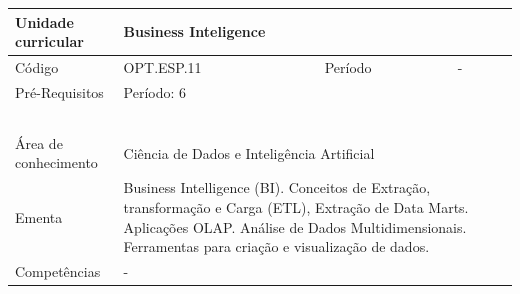 \clearpage
\newpage

\begin{quadro}[ht!]
  \centering\scriptsize
\caption{Unidade Curricular Business Inteligence}

\begin{tabular}{|p{2.5cm}|p{2.5cm}|p{2.5cm}|p{2.5cm}|p{2.5cm}|}\hline

  Unidade curricular & \multicolumn{4}{p{10cm}|}{ Business Inteligence }\\\hline
  Código & OPT.ESP.11 & Período & \multicolumn{2}{p{5cm}|}{ - }\\\hline
  Pré-Requisitos & \multicolumn{4}{p{10cm}|}{ Período: 6 } \\\hline
  \cellcolor{blue1}{ CH PRESENCIAL } &
    \cellcolor{blue1}{CH EAD Síncrona} &
    \cellcolor{blue1}{CH EAD Síncrona Mediada} &
    \cellcolor{blue1}{CH EAD Assíncrona} &
    \cellcolor{blue1}{CH APCC} \\\hline
  \cellcolor{blue1}{ 60 } &
    \cellcolor{blue1}{ 0 } &
    \cellcolor{blue1}{ 30 } &
    \cellcolor{blue1}{ 30 } &
    \cellcolor{blue1}{0} \\\hline
  \cellcolor{blue1}{ CH Teórica } &
    \cellcolor{blue1}{CH Prática} &
    \cellcolor{blue1}{CH Humanidades} &
    \cellcolor{blue1}{CH Extensão} &
    \cellcolor{blue1}{CH EAD TOTAL} \\\hline
  \cellcolor{blue1}{ 30 } &
    \cellcolor{blue1}{ 30 } &
    \cellcolor{blue1}{ 0 } &
    \cellcolor{blue1}{ 0 } &
    \cellcolor{blue1}{ 60 } \\\hline
  \cellcolor{blue1}{CARGA-HORÁRIA TOTAL} & \multicolumn{4}{p{10cm}|}{ \cellcolor{blue1}{ 60 } } \\\hline
  Área de conhecimento & \multicolumn{4}{p{10cm}|}{ Ciência de Dados e Inteligência Artificial } \\\hline
  Ementa & \multicolumn{4}{p{10cm}|}{ Business Intelligence (BI). Conceitos de Extração, transformação e Carga (ETL), Extração de Data Marts. Aplicações OLAP. Análise de Dados Multidimensionais. Ferramentas para criação e visualização de dados. } \\\hline
  Competências & \multicolumn{4}{p{10cm}|}{ - } \\\hline


  
	\end{tabular}

\end{quadro}


\clearpage
\newpage

